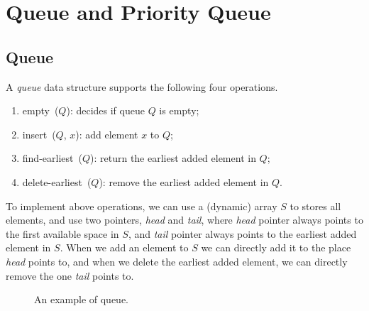 \section{Queue and Priority Queue}

\subsection*{Queue}

A \emph{queue} data structure supports the following four operations.
\vspace*{-\topsep}
\begin{enumerate}
\item empty~($Q$): decides if queue $Q$ is empty;
\item insert~($Q$, $x$): add element $x$ to $Q$;
\item find-earliest~($Q$): return the earliest added element in $Q$;
\item delete-earliest~($Q$): remove the earliest added element in $Q$.
\end{enumerate}

To implement above operations, we can use a (dynamic) array $S$ to stores all elements,
and use two pointers, \emph{head} and \emph{tail}, where \emph{head} pointer always points
to the first available space in $S$, and \emph{tail} pointer always points to the 
earliest added element in $S$. When we add an element to $S$ we can directly
add it to the place \emph{head} points to, and when we delete the earliest added
element, we can directly remove the one \emph{tail} points to.

\begin{figure}[h!]
\centering{}
\caption{An example of queue.}
\end{figure}

\begin{minipage}{0.8\textwidth}
	\xxx
	\xxx
	\xxx
	\xxx
\end{minipage}

\begin{minipage}{0.8\textwidth}
	\xxx
	\xxx
	\xxx
	\xxx
\end{minipage}

\begin{minipage}{0.8\textwidth}
	\xxx
	\xxx
	\xxx
\end{minipage}

